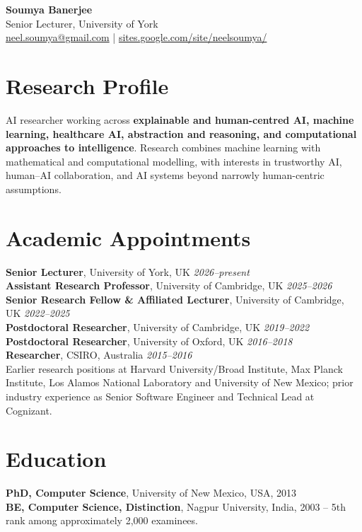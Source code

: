 \documentclass[9pt,a4paper]{article}
\newcommand{\job}[3]{\textbf{#1}, #2 \hfill \textit{#3}\\[-1pt]}
\begin{document}
\begin{center}
{\Large\bfseries\color{cvblue} Soumya Banerjee}\\[2pt]
Senior Lecturer, University of York\\
\href{mailto:neel.soumya@gmail.com}{neel.soumya@gmail.com}
\quad | \quad
\href{https://sites.google.com/site/neelsoumya/}{sites.google.com/site/neelsoumya/}
\end{center}

\section*{Research Profile}
AI researcher working across \textbf{explainable and human-centred AI, machine learning, healthcare AI, abstraction and reasoning, and computational approaches to intelligence}. Research combines machine learning with mathematical and computational modelling, with interests in trustworthy AI, human--AI collaboration, and AI systems beyond narrowly human-centric assumptions.

\section*{Academic Appointments}
\job{Senior Lecturer}{University of York, UK}{2026--present}
\job{Assistant Research Professor}{University of Cambridge, UK}{2025--2026}
\job{Senior Research Fellow \& Affiliated Lecturer}{University of Cambridge, UK}{2022--2025}
\job{Postdoctoral Researcher}{University of Cambridge, UK}{2019--2022}
\job{Postdoctoral Researcher}{University of Oxford, UK}{2016--2018}
\job{Researcher}{CSIRO, Australia}{2015--2016}
Earlier research positions at Harvard University/Broad Institute, Max Planck Institute, Los Alamos National Laboratory and University of New Mexico; prior industry experience as Senior Software Engineer and Technical Lead at Cognizant.

\section*{Education}
\textbf{PhD, Computer Science}, University of New Mexico, USA, 2013\\
\textbf{BE, Computer Science, Distinction}, Nagpur University, India, 2003 -- 5th rank among approximately 2,000 examinees.
\end{document}
